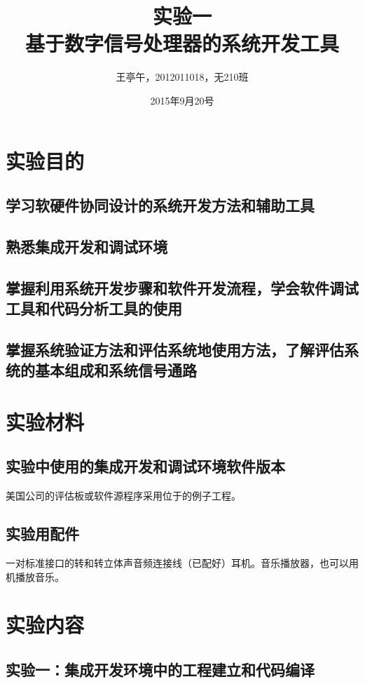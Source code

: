 \documentclass{article}
\begin{document}
\begin{CJK}{UTF8}{gbsn}
\title{实验一\\
基于数字信号处理器的系统开发工具}
\author{王亭午，2012011018，无210班}
\date{2015年9月20号}
\maketitle
\section{实验目的}
\subsection{学习软硬件协同设计的系统开发方法和辅助工具}
\subsection{熟悉集成开发和调试环境}
\subsection{掌握利用系统开发步骤和软件开发流程，学会软件调试工具和代码分析工具的使用}
\subsection{掌握系统验证方法和评估系统地使用方法，了解评估系统的基本组成和系统信号通路}
\section{实验材料}
\subsection{实验中使用的集成开发和调试环境软件版本}
美国公司的评估板或软件源程序采用位于的例子工程。
\subsection{实验用配件}
一对标准接口的转和转立体声音频连接线（已配好）耳机。音乐播放器，也可以用机播放音乐。
\section{实验内容}
\subsection{实验一：集成开发环境中的工程建立和代码编译}

\end{CJK}
\end{document}
